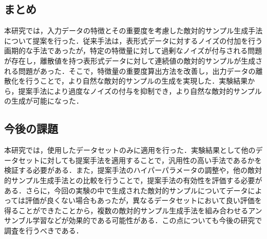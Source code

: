 \subsection{まとめ}
本研究では，入力データの特徴とその重要度を考慮した敵対的サンプル生成手法について提案を行った．従来手法は，表形式データに対するノイズの付加を行う画期的な手法であったが，特定の特徴量に対して過剰なノイズが付与される問題が存在し，離散値を持つ表形式データに対して連続値の敵対的サンプルが生成される問題があった．そこで，特徴量の重要度算出方法を改善し，出力データの離散化を行うことで，より自然な敵対的サンプルの生成を実現した．実験結果から，提案手法により過度なノイズの付与を抑制でき，より自然な敵対的サンプルの生成が可能になった．
\subsection{今後の課題}
本研究では，使用したデータセットのみに適用を行った．実験結果として他のデータセットに対しても提案手法を適用することで，汎用性の高い手法であるかを検証する必要がある．また，提案手法のハイパーパラメータの調整や，他の敵対的サンプル生成手法との比較を行うことで，提案手法の有効性を評価する必要がある．さらに，今回の実験の中で生成された敵対的サンプルについてデータによっては評価が良くない場合もあったが，異なるデータセットにおいて良い評価を得ることができたことから，複数の敵対的サンプル生成手法を組み合わせるアンサンブル学習などが効果的である可能性がある．この点についても今後の研究で調査を行うべきである．
